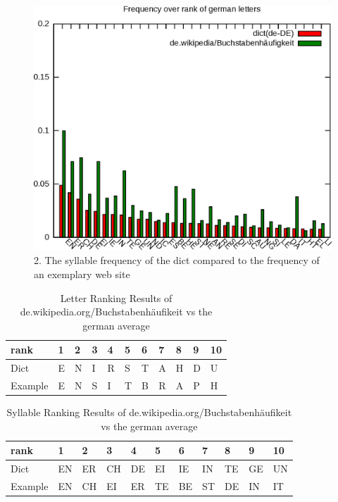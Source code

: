 \begin{frame}[c]

\begin{figure}[htp]
\begin{center}
  \includegraphics[width=1\textheight]{graphics/syllables_de}
  \caption[fig:letters_de]{2. The syllable frequency of the dict compared to the
  frequency of an exemplary web site}
  \label{fig:syllablefreq}
\end{center}
\end{figure}
\end{frame}

\begin{frame}[c]
\begin{table}
\begin{tabular}{|lllllllllll|}
\hline
rank&1&2&3&4&5&6&7&8&9&10\\
\hline
Dict&E&N&I&R&S&T&A&H&D&U\\
Example&E&N&S&I&T&B&R&A&P&H\\
\hline
\end{tabular}
\caption{Letter Ranking Results of de.wikipedia.org/Buchstabenhäufikeit vs the
german average}
\label{tbl:letterRank}
\end{table}

\begin{table}
\begin{tabular}{|lllllllllll|}
\hline
rank&1&2&3&4&5&6&7&8&9&10\\
\hline
Dict&EN&ER&CH&DE&EI&IE&IN&TE&GE&UN\\
Example&EN&CH&EI&ER&TE&BE&ST&DE&IN&IT\\
\hline
\end{tabular}
\caption{Syllable Ranking Results of de.wikipedia.org/Buchstabenhäufikeit vs the
german average}
\label{tbl:syllableRank}
\end{table}
\end{frame}

